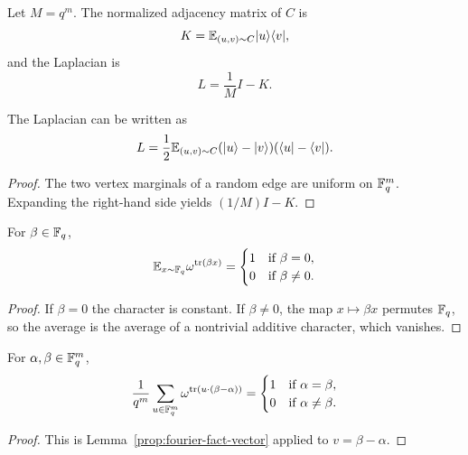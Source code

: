 \begin{definition}\label{def:adjacency-laplacian}
	\leanok
	Let $M=q^m$. The normalized adjacency matrix of $C$ is
	\[
		K = \mathbb{E}_{(u,v)\sim C} \lvert u \rangle\langle v \rvert,
	\]
	and the Laplacian is
	\[
		L = \frac{1}{M}I-K.
	\]
\end{definition}

\begin{lemma}\label{prop:laplacian-rewrite}
	\leanok
	The Laplacian can be written as
	\[
		L = \frac12 \mathbb{E}_{(u,v)\sim C} (\lvert u \rangle-\lvert v \rangle)(\langle u \rvert-\langle v \rvert).
	\]
\end{lemma}
\begin{proof}
	\leanok
	The two vertex marginals of a random edge are uniform on $\mathbb{F}_q^m$. Expanding the right-hand side yields $(1/M)I-K$.
\end{proof}

\begin{lemma}\label{lem:character-average-scalar}
	\leanok
	For $\beta \in \mathbb{F}_q$,
	\[
		\mathbb{E}_{x \sim \mathbb{F}_q} \omega^{\operatorname{tr}(\beta x)} =
		\begin{cases}
			1 & \text{if } \beta=0,    \\
			0 & \text{if } \beta\ne 0.
		\end{cases}
	\]
\end{lemma}
\begin{proof}
	\leanok
	If $\beta=0$ the character is constant. If $\beta\ne 0$, the map $x \mapsto \beta x$ permutes $\mathbb{F}_q$, so the average is the average of a nontrivial additive character, which vanishes.
\end{proof}

\begin{lemma}\label{lem:character-average-vector}
	\leanok
	For $\alpha,\beta \in \mathbb{F}_q^m$,
	\[
		\frac{1}{q^m}\sum_{u \in \mathbb{F}_q^m} \omega^{\operatorname{tr}(u\cdot(\beta-\alpha))} =
		\begin{cases}
			1 & \text{if } \alpha=\beta,    \\
			0 & \text{if } \alpha\ne \beta.
		\end{cases}
	\]
\end{lemma}
\begin{proof}
	\leanok
	This is Lemma~\ref{prop:fourier-fact-vector} applied to $v=\beta-\alpha$.
\end{proof}

